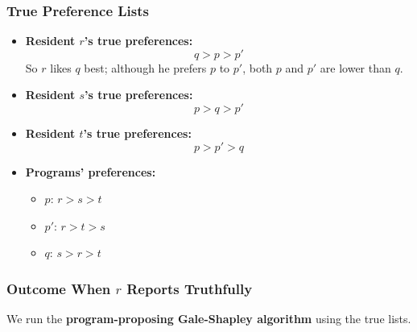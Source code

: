 \documentclass[12pt]{article}
\begin{document}
\subsubsection*{True Preference Lists}
\begin{itemize}
    \item \textbf{Resident $r$'s true preferences:}  
    \[
    q > p > p'
    \]
    So $r$ likes $q$ best; although he prefers $p$ to $p'$, both $p$ and $p'$ are lower than $q$.

    \item \textbf{Resident $s$'s true preferences:}  
    \[
    p > q > p'
    \]

    \item \textbf{Resident $t$'s true preferences:}  
    \[
    p > p' > q
    \]

    \item \textbf{Programs' preferences:}
    \begin{itemize}
        \item $p$: $r > s > t$
        \item $p'$: $r > t > s$
        \item $q$: $s > r > t$
    \end{itemize}
\end{itemize}

\subsubsection*{Outcome When $r$ Reports Truthfully}
We run the \textbf{program-proposing Gale-Shapley algorithm} using the true lists.
\end{document}
